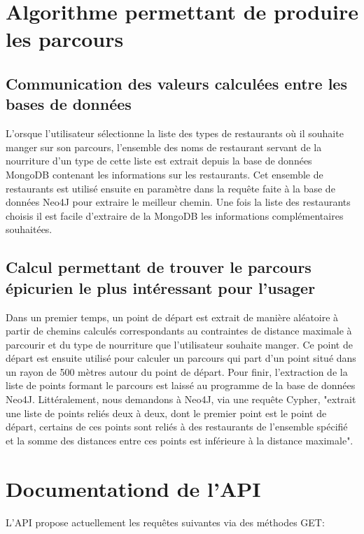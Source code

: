 \documentclass[11pt,a4paper]{article}
\begin{document}
\section{Algorithme permettant de produire les parcours}

\subsection{Communication des valeurs calculées entre les bases de données}

    L'orsque l'utilisateur sélectionne la liste des types de restaurants où il souhaite manger sur son parcours, l'ensemble des noms de restaurant servant de la nourriture d'un type de cette liste est extrait depuis la base de données MongoDB contenant les informations sur les restaurants. Cet ensemble de restaurants est utilisé ensuite en paramètre dans la requête faite à la base de données Neo4J pour extraire le meilleur chemin.
    Une fois la liste des restaurants choisis il est facile d'extraire de la MongoDB les informations complémentaires souhaitées.

\subsection{Calcul permettant de trouver le parcours épicurien le plus intéressant pour l'usager}

    Dans un premier temps, un point de départ est extrait de manière aléatoire à partir de chemins calculés correspondants au contraintes de distance maximale à parcourir et du type de nourriture que l'utilisateur souhaite manger.
    Ce point de départ est ensuite utilisé pour calculer un parcours qui part d'un point situé dans un rayon de 500 mètres autour du point de départ. Pour finir, l'extraction de la liste de points formant le parcours est laissé au programme de la base de données Neo4J. Littéralement, nous demandons à Neo4J, via une requête Cypher, "extrait une liste de points reliés deux à deux, dont le premier point est le point de départ, certains de ces points sont reliés à des restaurants de l'ensemble spécifié et la somme des distances entre ces points est inférieure à la distance maximale".  

\section{Documentationd de l'API}

    L'API propose actuellement les requêtes suivantes via des méthodes GET:
\end{document}
